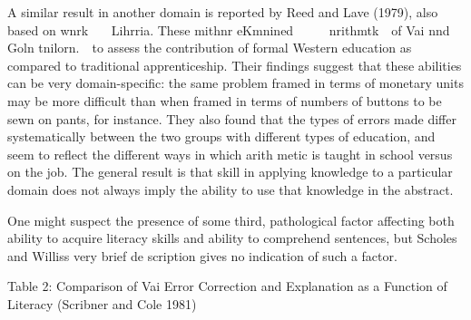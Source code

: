 \begin{listWWNumxxxviileveli}
\item 
\begin{styleStandard}
A similar result in another domain is reported by Reed and Lave (1979), also based on wnrk \ \ \ Lihrria. These mithnr eKmnined \ \ \ \ \ nrithmtk\ \ of Vai nnd Goln tnilorn.\ \ to assess the contribution of formal Western education as compared to traditional apprenticeship. Their findings suggest that these abilities can be very domain-specific: the same problem framed in terms of monetary units may be more difficult than when framed in terms of numbers of buttons to be sewn on pants, for instance. They also found that the types of errors made differ systematically between the two groups with different types of education, and seem to reflect the different ways in which arith\- metic is taught in school versus on the job. The general result is that skill in applying knowledge to a particular domain does not always imply the ability to use that knowledge in the abstract.
\end{styleStandard}


\item 
\begin{styleStandard}
One might suspect the presence of some third, pathological factor affecting both ability to acquire literacy skills and ability to comprehend sentences, but Scholes and Willis{\textquotesingle}s very brief de\- scription gives no indication of such a factor.
\end{styleStandard}


\end{listWWNumxxxviileveli}
\clearpage\setcounter{page}{1}\begin{styleStandard}
Table 2: Comparison of Vai Error Correction and Explanation as a Function of Literacy (Scribner and Cole 1981)
\end{styleStandard}


